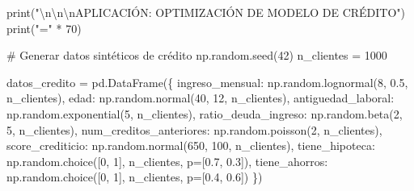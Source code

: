 \documentclass[
  doc,
  floatsintext,
  longtable,
  a4paper,
  nolmodern,
  notxfonts,
  notimes,
  12pt,
  colorlinks=true,linkcolor=blue,citecolor=blue,urlcolor=blue]{apa7}
\newenvironment{Shaded}{\begin{snugshade}}{\end{snugshade}}
\newcommand{\BuiltInTok}[1]{\textcolor[rgb]{0.00,0.23,0.31}{#1}}
\newcommand{\CharTok}[1]{\textcolor[rgb]{0.13,0.47,0.30}{#1}}
\newcommand{\CommentTok}[1]{\textcolor[rgb]{0.37,0.37,0.37}{#1}}
\newcommand{\DecValTok}[1]{\textcolor[rgb]{0.68,0.00,0.00}{#1}}
\newcommand{\FloatTok}[1]{\textcolor[rgb]{0.68,0.00,0.00}{#1}}
\newcommand{\NormalTok}[1]{\textcolor[rgb]{0.00,0.23,0.31}{#1}}
\newcommand{\OperatorTok}[1]{\textcolor[rgb]{0.37,0.37,0.37}{#1}}
\newcommand{\StringTok}[1]{\textcolor[rgb]{0.13,0.47,0.30}{#1}}
\begin{document}
\begin{Shaded}
\begin{Highlighting}[]
\BuiltInTok{print}\NormalTok{(}\StringTok{"}\CharTok{\textbackslash{}n\textbackslash{}n\textbackslash{}n}\StringTok{APLICACIÓN: OPTIMIZACIÓN DE MODELO DE CRÉDITO"}\NormalTok{)}
\BuiltInTok{print}\NormalTok{(}\StringTok{"="} \OperatorTok{*} \DecValTok{70}\NormalTok{)}

\CommentTok{\# Generar datos sintéticos de crédito}
\NormalTok{np.random.seed(}\DecValTok{42}\NormalTok{)}
\NormalTok{n\_clientes }\OperatorTok{=} \DecValTok{1000}

\NormalTok{datos\_credito }\OperatorTok{=}\NormalTok{ pd.DataFrame(\{}
    \StringTok{\textquotesingle{}ingreso\_mensual\textquotesingle{}}\NormalTok{: np.random.lognormal(}\DecValTok{8}\NormalTok{, }\FloatTok{0.5}\NormalTok{, n\_clientes),}
    \StringTok{\textquotesingle{}edad\textquotesingle{}}\NormalTok{: np.random.normal(}\DecValTok{40}\NormalTok{, }\DecValTok{12}\NormalTok{, n\_clientes),}
    \StringTok{\textquotesingle{}antiguedad\_laboral\textquotesingle{}}\NormalTok{: np.random.exponential(}\DecValTok{5}\NormalTok{, n\_clientes),}
    \StringTok{\textquotesingle{}ratio\_deuda\_ingreso\textquotesingle{}}\NormalTok{: np.random.beta(}\DecValTok{2}\NormalTok{, }\DecValTok{5}\NormalTok{, n\_clientes),}
    \StringTok{\textquotesingle{}num\_creditos\_anteriores\textquotesingle{}}\NormalTok{: np.random.poisson(}\DecValTok{2}\NormalTok{, n\_clientes),}
    \StringTok{\textquotesingle{}score\_crediticio\textquotesingle{}}\NormalTok{: np.random.normal(}\DecValTok{650}\NormalTok{, }\DecValTok{100}\NormalTok{, n\_clientes),}
    \StringTok{\textquotesingle{}tiene\_hipoteca\textquotesingle{}}\NormalTok{: np.random.choice([}\DecValTok{0}\NormalTok{, }\DecValTok{1}\NormalTok{], n\_clientes, p}\OperatorTok{=}\NormalTok{[}\FloatTok{0.7}\NormalTok{, }\FloatTok{0.3}\NormalTok{]),}
    \StringTok{\textquotesingle{}tiene\_ahorros\textquotesingle{}}\NormalTok{: np.random.choice([}\DecValTok{0}\NormalTok{, }\DecValTok{1}\NormalTok{], n\_clientes, p}\OperatorTok{=}\NormalTok{[}\FloatTok{0.4}\NormalTok{, }\FloatTok{0.6}\NormalTok{])}
\NormalTok{\})}


\end{Highlighting}
\end{Shaded}
\end{document}

